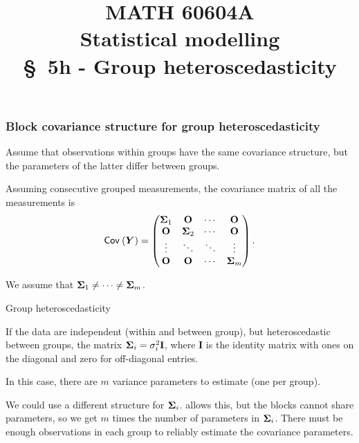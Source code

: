 \documentclass{beamer}
\title[\color{white}{MATH 60604A \S~5h - Group heteroscedasticity}]{\texorpdfstring{MATH 60604A \\Statistical modelling \\ \S~5h - Group heteroscedasticity}{MATH 60604A \\Statistical modelling \\ \S~5h - Group heteroscedasticity}}
\author{}
\institute{HEC Montréal\\
Department of Decision Sciences}
\date{}
\begin{document}
\frame{\titlepage}


\begin{frame}
\frametitle{Block covariance structure for group heteroscedasticity}
\bi 
 \item Assume that observations within groups have the same covariance structure, but the parameters of the latter differ between groups.
 \item 
 Assuming consecutive grouped measurements, the covariance matrix of all the measurements is 
 \begin{align*}
  {\mathsf{Cov}_{}}\left(\boldsymbol {Y}\right) = \begin{pmatrix}
                 \boldsymbol {\Sigma}_1 & \mathbf{O} & \cdots & \mathbf{O}\\
                  \mathbf{O} &\boldsymbol {\Sigma}_2 & \cdots & \mathbf{O} \\
                  \vdots & \ddots & \ddots & \vdots \\
                   \mathbf{O} & \mathbf{O} & \cdots & \boldsymbol {\Sigma}_m 
                \end{pmatrix}.
\end{align*}
\item We assume that $\boldsymbol {\Sigma}_1 \neq \cdots \neq \boldsymbol {\Sigma}_m$.
\ei \end{frame}
\begin{frame}{Group heteroscedasticity}
\bi
\item If the data are independent (within and between group), but heteroscedastic between groups, the matrix $\boldsymbol {\Sigma}_i = \sigma_i^2\mathbf{I}$, where $\mathbf{I}$ is the identity matrix with ones on the diagonal and zero for off-diagonal entries.  
\item In this case, there are $m$ variance parameters to estimate (one per group).
 
\item We could use a different structure for $\boldsymbol {\Sigma}_i$. \SASlang{} allows this, but the blocks cannot share parameters, so we get $m$ times the number of parameters in $\boldsymbol {\Sigma}_i$. There must be enough observations in each group to reliably estimate the covariance parameters.
\ei
\end{frame}
\end{document}
